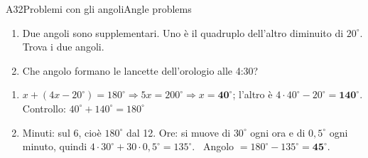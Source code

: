 \begin{esercizio}{A3}{2}{Problemi con gli angoli}{Angle problems}
\begin{enumerate}
\item Due angoli sono supplementari. Uno è il quadruplo dell'altro diminuito di $20^\circ$. Trova i due angoli.
\item Che angolo formano le lancette dell'orologio alle 4:30?
\end{enumerate}
\end{esercizio}
\begin{solbox}
\begin{enumerate}
\item $x+(4x-20^\circ)=180^\circ\Rightarrow 5x=200^\circ\Rightarrow x=\mathbf{40^\circ}$; l'altro è $4\cdot40^\circ-20^\circ=\mathbf{140^\circ}$. Controllo: $40^\circ+140^\circ=180^\circ$ \checkmark
\item Minuti: sul 6, cioè $180^\circ$ dal 12. Ore: si muove di $30^\circ$ ogni ora e di $0,5^\circ$ ogni minuto, quindi $4\cdot30^\circ+30\cdot0,5^\circ=135^\circ$. \ Angolo $=180^\circ-135^\circ=\mathbf{45^\circ}$.
\end{enumerate}
\end{solbox}



